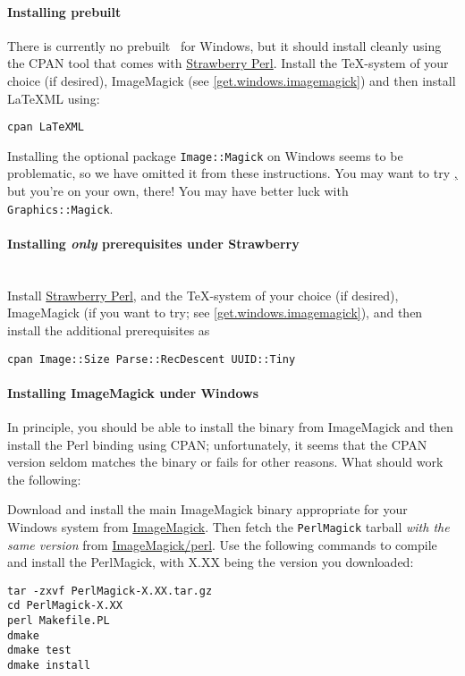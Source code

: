 \documentclass{article}
\begin{document}
\paragraph*{Installing prebuilt}\label{get.windows.strawberry}
There is currently no prebuilt \LaTeXML\ for Windows,
but it should install cleanly using the CPAN tool that comes with
\href{http://strawberryperl.com}{Strawberry Perl}.
Install the \TeX-system of your choice (if desired),
ImageMagick (see \ref{get.windows.imagemagick})
and then install LaTeXML using:
\begin{lstlisting}[style=shell]
cpan LaTeXML
\end{lstlisting}

Installing the optional package \texttt{Image::Magick} on Windows seems to be problematic,
so we have omitted it from these instructions.
You may want to try \href{ImageMagick}, but
you're on your own, there!  You may  have better luck with \texttt{Graphics::Magick}.

\paragraph*{Installing \emph{only} prerequisites  under Strawberry}\label{get.windows.strawberry.prereq}\\
Install \href{http://strawberryperl.com}{Strawberry Perl}, and
the \TeX-system of your choice (if desired), 
ImageMagick (if you want to try; see \ref{get.windows.imagemagick}),
and then install the additional prerequisites as
\begin{lstlisting}[style=shell]
cpan Image::Size Parse::RecDescent UUID::Tiny
\end{lstlisting}

\paragraph*{Installing ImageMagick under Windows}\label{get.windows.imagemagick}
In principle, you should be able to install the binary from ImageMagick
and then install the Perl binding using CPAN; unfortunately, it seems that the
CPAN version seldom matches the binary or fails for other reasons.  What
should work the following:

Download and install the main ImageMagick binary appropriate for your Windows system
from \href{http://imagemagick.org/script/binary-releases.php#windows}{ImageMagick}.
Then fetch the \texttt{PerlMagick} tarball \emph{with the same version} from
\href{http://imagemagick.com/download/perl/}{ImageMagick/perl}.
Use the following commands to compile and install the PerlMagick,
with X.XX being the version you downloaded:
\begin{lstlisting}[style=shell]
tar -zxvf PerlMagick-X.XX.tar.gz
cd PerlMagick-X.XX
perl Makefile.PL
dmake
dmake test
dmake install
\end{lstlisting}
\end{document}
